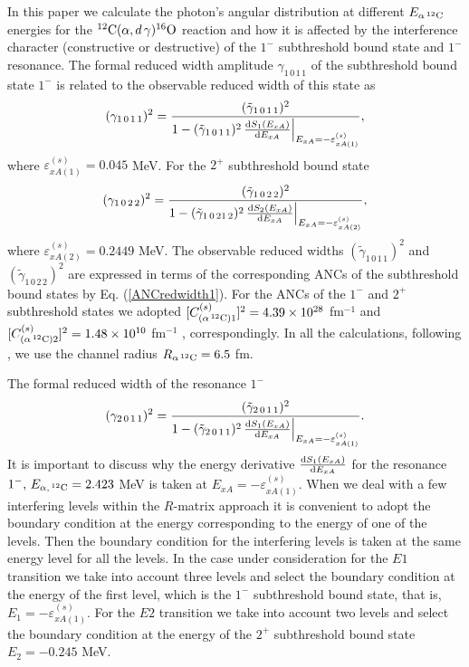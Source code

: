 \documentclass[prl,unsortedaddress,groupedaddress,twocolumn,amsmath,amsfonts,amssymb,showpacs,floatfix,nofootinbib]{revtex4}
\begin{document}
In this paper we calculate  the photon's angular distribution at different $E_{\alpha\,{}^{12}{\rm C}}$ energies for the 
${}^{12}{\rm C}(\alpha,d\,\gamma){}^{16}{\rm O}$ reaction and how it is affected by the interference character (constructive or destructive) of the $1^{-}$ subthreshold bound state and $1^{-}$ resonance.  
The formal reduced width amplitude $\gamma_{1\,0\,1\,1}$ of the subthreshold bound state $1^{-}$ is related to the observable reduced width of this state
as
\begin{align}
(\gamma_{1\,0\,1\,1})^{2}=\frac{   ({\tilde \gamma}_{1\,0\,1\,1})^{2}  }{1 - ({\tilde \gamma}_{1\,0\,1\,1})^{2}\,\frac{ {\rm d}S_{1}(E_{xA}) }{  {\rm d}E_{xA} }\Big|_{ E_{xA}=-\varepsilon_{xA(1)}^{(s)}}},
\label{gamma111}
\end{align}
where $\varepsilon_{xA(1)}^{(s)} = 0.045$ MeV.
For the $2^{+}$ subthreshold bound state  
\begin{align}
(\gamma_{1\,0\,2\,2})^{2}=\frac{   ({\tilde \gamma}_{1\,0\,2\,2})^{2}  }{1 - ({\tilde \gamma}_{1\,0\,21\,2})^{2}\,\frac{ {\rm d}S_{2}(E_{xA}) }{  {\rm d}E_{xA} }\Big|_{ E_{xA}=-\varepsilon_{xA(2)}^{(s)}}},
\label{gamma122}
\end{align}
where $\varepsilon_{xA(2)}^{(s)}=0.2449$ MeV.  The observable reduced widths $({\tilde \gamma}_{1\,0\,1\,1})^{2}$ and $({\tilde \gamma}_{1\,0\,2\,2})^{2}$ are expressed in terms of the corresponding ANCs of the subthreshold bound states by Eq. (\ref{ANCredwidth1}). 
For the ANCs of the $1^{-}$ and $2^{+}$ subthreshold states we adopted $[C_{(\alpha\,{}^{12}{\rm C})1}^{(s)}]^{2}=4.39 \times 10^{28}$ fm${}^{-1}$ and 
$[C_{(\alpha\,{}^{12}{\rm C})2}^{(s)}]^{2}=1.48 \times 10^{10}$ fm${}^{-1}$ \cite{avila}, correspondingly.
In all the calculations, following \cite{brune1999}, we use the channel radius $R_{\alpha\,{}^{12}{\rm C}}= 6.5$ fm. 
 
The formal reduced width of the resonance $1^{-}$ 
\begin{align}
(\gamma_{2\,0\,1\,1})^{2}=\frac{({\tilde \gamma}_{2\,0\,1\,1})^{2}  }{1 - ({\tilde \gamma}_{2\,0\,1\,1})^{2}\,\frac{ {\rm d}S_{1}(E_{xA}) }{  {\rm d}E_{xA} }\Big|_{ E_{xA}=-\varepsilon_{xA(1)}^{(s)}    }}.
\label{gamma211}
\end{align}
It is important to discuss why the energy derivative $\frac{ {\rm d}S_{1}(E_{xA}) }{  {\rm d}E_{xA} }$
for the resonance $1^{-},\,E_{\alpha,\,{}^{12}{\rm C}}=2.423$ MeV is taken at $E_{xA}=-\varepsilon_{xA(1)}^{(s)}$. When we deal with a few interfering levels within the $R$-matrix approach it is convenient to adopt the boundary condition at the energy corresponding to the energy of one of the levels. Then the boundary condition for the interfering levels is taken at the same energy level for all the levels. In the case under consideration for the $E1$ transition we take into account three levels and select the boundary condition at the energy of the first level, which is the $1^{-}$ subthreshold bound state, that is, $E_{1}=-\varepsilon_{xA(1)}^{(s)}$. For the $E2$ transition we take into account two levels and select the boundary condition at the energy of the $2^{+}$ subthreshold bound state $E_{2}=-0.245$ MeV.  
\end{document}
